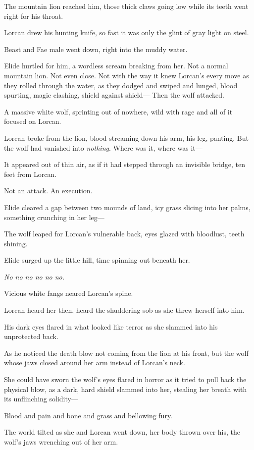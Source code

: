 The mountain lion reached him, those thick claws going low while its teeth went right for his throat.

Lorcan drew his hunting knife, so fast it was only the glint of gray light on steel.

Beast and Fae male went down, right into the muddy water.

Elide hurtled for him, a wordless scream breaking from her. Not a normal mountain lion. Not even close. Not with the way it knew Lorcan's every move as they rolled through the water, as they dodged and swiped and lunged, blood spurting, magic clashing, shield against shield--- Then the wolf attacked.

A massive white wolf, sprinting out of nowhere, wild with rage and all of it focused on Lorcan.

Lorcan broke from the lion, blood streaming down his arm, his leg, panting. But the wolf had vanished into \emph{nothing}. Where was it, where was it---

It appeared out of thin air, as if it had stepped through an invisible bridge, ten feet from Lorcan.

Not an attack. An execution.

Elide cleared a gap between two mounds of land, icy grass slicing into her palms, something crunching in her leg---

The wolf leaped for Lorcan's vulnerable back, eyes glazed with bloodlust, teeth shining.

Elide surged up the little hill, time spinning out beneath her.

\emph{No no no no no no.}

Vicious white fangs neared Lorcan's spine.

Lorcan heard her then, heard the shuddering sob as she threw herself into him.

His dark eyes flared in what looked like terror as she slammed into his unprotected back.

As he noticed the death blow not coming from the lion at his front, but the wolf whose jaws closed around her arm instead of Lorcan's neck.

She could have sworn the wolf's eyes flared in horror as it tried to pull back the physical blow, as a dark, hard shield slammed into her, stealing her breath with its unflinching solidity---

Blood and pain and bone and grass and bellowing fury.

The world tilted as she and Lorcan went down, her body thrown over his, the wolf's jaws wrenching out of her arm.

